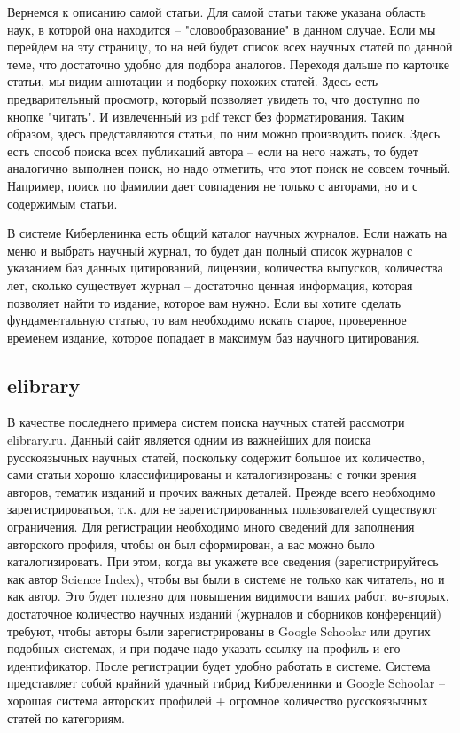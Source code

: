 \documentclass{report}
\begin{document}
Вернемся к описанию самой статьи. Для самой статьи также указана область наук, в которой она находится -- "словообразование" в данном случае. Если мы перейдем на эту страницу, то на ней будет список всех научных статей по данной теме, что достаточно удобно для подбора аналогов. Переходя дальше по карточке статьи, мы видим аннотации и подборку похожих статей. Здесь есть предварительный просмотр, который позволяет увидеть то, что доступно по кнопке "читать". И извлеченный из pdf текст без форматирования.  Таким образом, здесь представляются статьи, по ним можно производить поиск. Здесь есть способ поиска всех публикаций автора -- если на него нажать, то будет аналогично выполнен поиск, но надо отметить, что этот поиск не совсем точный. Например, поиск по фамилии дает совпадения не только с авторами, но и с содержимым статьи. 

В системе Киберленинка есть общий каталог научных журналов. Если нажать на меню и выбрать научный журнал, то будет дан полный список журналов с указанием баз данных цитирований, лицензии, количества выпусков, количества лет, сколько существует журнал -- достаточно ценная информация, которая позволяет найти то издание, которое вам нужно. Если вы хотите сделать фундаментальную статью, то вам необходимо искать старое, проверенное временем издание, которое попадает  в максимум баз научного цитирования. 

\subsection{elibrary}
В качестве последнего  примера систем поиска научных статей рассмотри elibrary.ru. Данный сайт является одним из важнейших для поиска русскоязычных научных статей, поскольку содержит большое их количество, сами статьи хорошо классифицированы и каталогизированы с точки зрения авторов, тематик изданий и прочих важных деталей. Прежде всего необходимо зарегистрироваться, т.к. для не зарегистрированных пользователей существуют ограничения. Для регистрации необходимо много сведений для заполнения авторского профиля, чтобы он был сформирован, а вас можно было каталогизировать. При этом, когда вы укажете все сведения (зарегистрируйтесь как автор Science Index), чтобы вы были в системе не только как читатель, но и как автор. Это будет полезно для повышения видимости ваших работ, во-вторых, достаточное количество научных изданий (журналов и сборников конференций) требуют, чтобы авторы были зарегистрированы в Google Schoolar или других подобных системах, и при подаче надо указать ссылку на профиль и его идентификатор. После регистрации будет удобно работать в системе. Система представляет собой крайний удачный гибрид Кибреленинки и Google Schoolar -- хорошая система авторских профилей + огромное количество русскоязычных статей по категориям. 
\end{document}

